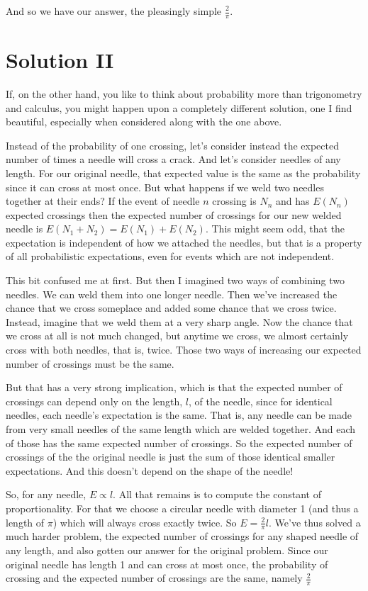 \documentclass[11pt]{tufte-handout}
\begin{document}
And so we have our answer, the pleasingly simple $\frac{2}{\pi}$.

\section{Solution II}
If, on the other hand, you like to think about probability more than trigonometry and calculus, you might happen upon a completely different solution, one I find beautiful, especially when considered along with the one above.

Instead of the probability of one crossing, let's consider instead the expected number of times a needle will cross a crack. And let's consider needles of any length. For our original needle, that expected value is the same as the probability since it can cross at most once.  But what happens if we weld two needles together at their ends?  If the event of needle $n$ crossing is $N_n$ and has $E(N_n)$ expected crossings then the expected number of crossings for our new welded needle is $E(N_1 + N_2) = E(N_1) + E(N_2)$.  This might seem odd, that the expectation is independent of how we attached the needles, but that is a property of all probabilistic expectations, even for events which are not independent. 

This bit confused me at first.  But then I imagined two ways of combining two needles.  We can weld them into one longer needle.  Then we've increased the chance that we cross someplace and added some chance that we cross twice.  Instead, imagine that we weld them at a very sharp angle.  Now the chance that we cross at all is not much changed, but anytime we cross, we almost certainly cross with both needles, that is, twice.  Those two ways of increasing our expected number of crossings must be the same.

But that has a very strong implication, which is that the expected number of crossings can depend only on the length, $l$, of the needle, since for identical needles, each needle's expectation is the same.  That is, any needle can be made from very small needles of the same length which are welded together.  And each of those has the same expected number of crossings.  So the expected number of crossings of the the original needle is just the sum of those identical smaller expectations.  And this doesn't depend on the shape of the needle!

So, for any needle, $E \propto l$. All that remains is to compute the constant of proportionality.  For that we choose a circular needle with diameter 1 (and thus a length of $\pi$) which will always cross exactly twice. So $E = \frac{2}{\pi}l$.  We've thus solved a much harder problem, the expected number of crossings for any shaped needle of any length, and also gotten our answer for the original problem.  Since our original needle has length 1 and can cross at most once, the probability of crossing and the expected number of crossings are the same, namely $\frac{2}{\pi}$  
\end{document}
